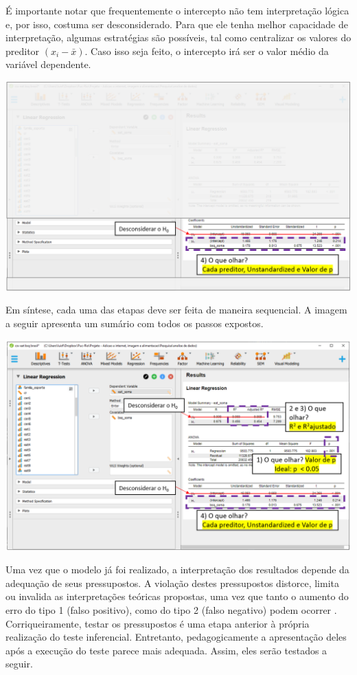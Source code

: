 \documentclass[
]{book}
\begin{document}
É importante notar que frequentemente o intercepto não tem interpretação lógica e, por isso, costuma ser desconsiderado. Para que ele tenha melhor capacidade de interpretação, algumas estratégias são possíveis, tal como centralizar os valores do preditor \((x_i-\bar{x})\). Caso isso seja feito, o intercepto irá ser o valor médio da variável dependente.

\includegraphics{./img/cap_reg_resultados4.png}

Em síntese, cada uma das etapas deve ser feita de maneira sequencial. A imagem a seguir apresenta um sumário com todos os passos expostos.

\includegraphics{./img/cap_reg_resultados_juntos.png}

Uma vez que o modelo já foi realizado, a interpretação dos resultados depende da adequação de seus pressupostos. A violação destes pressupostos distorce, limita ou invalida as interpretações teóricas propostas, uma vez que tanto o aumento do erro do tipo 1 (falso positivo), como do tipo 2 (falso negativo) podem ocorrer \citep{Lix1996, Barker2015, Ernst2017}. Corriqueiramente, testar os pressupostos é uma etapa anterior à própria realização do teste inferencial. Entretanto, pedagogicamente a apresentação deles após a execução do teste parece mais adequada. Assim, eles serão testados a seguir.
\end{document}
